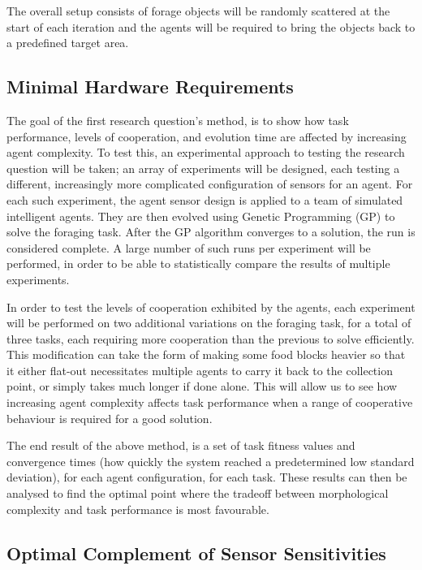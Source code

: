 \documentclass[a4paper,12pt]{article}
\begin{document}
The overall setup consists of forage objects will be randomly scattered at the start of each iteration and the agents will be required to bring the objects back to a predefined target area.

\subsection{Minimal Hardware Requirements}
The goal of the first research question's method, is to show how task performance, levels of cooperation, and evolution time are affected by increasing agent complexity. To test this, an experimental approach to testing the research question will be taken; an array of experiments will be designed, each testing a different, increasingly more complicated configuration of sensors for an agent. For each such experiment, the agent sensor design is applied to a team of simulated intelligent agents. They are then evolved using Genetic Programming (GP)\cite{Koza90} to solve the foraging task. After the GP algorithm converges to a solution, the run is considered complete. A large number of such runs per experiment will be performed, in order to be able to statistically compare the results of multiple experiments.

In order to test the levels of cooperation exhibited by the agents, each experiment will be performed on two additional variations on the foraging task, for a total of three tasks, each requiring more cooperation than the previous to solve efficiently. This modification can take the form of making some food blocks heavier so that it either flat-out necessitates multiple agents to carry it back to the collection point, or simply takes much longer if done alone.
This will allow us to see how increasing agent complexity affects task performance when a range of cooperative behaviour is required for a good solution.

The end result of the above method, is a set of task fitness values and convergence times (how quickly the system reached a predetermined low standard deviation), for each agent configuration, for each task. These results can then be analysed to find the optimal point where the tradeoff between morphological complexity and task performance is most favourable.

\subsection{Optimal Complement of Sensor Sensitivities}
\end{document}
